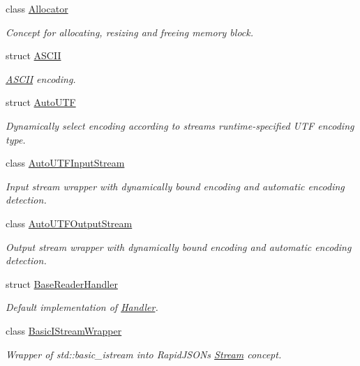 \begin{DoxyCompactItemize}
\item 
class \mbox{\hyperlink{classrapidjson_1_1_allocator}{Allocator}}
\begin{DoxyCompactList}\small\item\em Concept for allocating, resizing and freeing memory block. \end{DoxyCompactList}\item 
struct \mbox{\hyperlink{structrapidjson_1_1_a_s_c_i_i}{A\+S\+C\+II}}
\begin{DoxyCompactList}\small\item\em \mbox{\hyperlink{structrapidjson_1_1_a_s_c_i_i}{A\+S\+C\+II}} encoding. \end{DoxyCompactList}\item 
struct \mbox{\hyperlink{structrapidjson_1_1_auto_u_t_f}{Auto\+U\+TF}}
\begin{DoxyCompactList}\small\item\em Dynamically select encoding according to stream\textquotesingle{}s runtime-\/specified U\+TF encoding type. \end{DoxyCompactList}\item 
class \mbox{\hyperlink{classrapidjson_1_1_auto_u_t_f_input_stream}{Auto\+U\+T\+F\+Input\+Stream}}
\begin{DoxyCompactList}\small\item\em Input stream wrapper with dynamically bound encoding and automatic encoding detection. \end{DoxyCompactList}\item 
class \mbox{\hyperlink{classrapidjson_1_1_auto_u_t_f_output_stream}{Auto\+U\+T\+F\+Output\+Stream}}
\begin{DoxyCompactList}\small\item\em Output stream wrapper with dynamically bound encoding and automatic encoding detection. \end{DoxyCompactList}\item 
struct \mbox{\hyperlink{structrapidjson_1_1_base_reader_handler}{Base\+Reader\+Handler}}
\begin{DoxyCompactList}\small\item\em Default implementation of \mbox{\hyperlink{classrapidjson_1_1_handler}{Handler}}. \end{DoxyCompactList}\item 
class \mbox{\hyperlink{classrapidjson_1_1_basic_i_stream_wrapper}{Basic\+I\+Stream\+Wrapper}}
\begin{DoxyCompactList}\small\item\em Wrapper of {\ttfamily std\+::basic\+\_\+istream} into Rapid\+J\+S\+ON\textquotesingle{}s \mbox{\hyperlink{classrapidjson_1_1_stream}{Stream}} concept. \end{DoxyCompactList}\item 

\end{DoxyCompactItemize}
